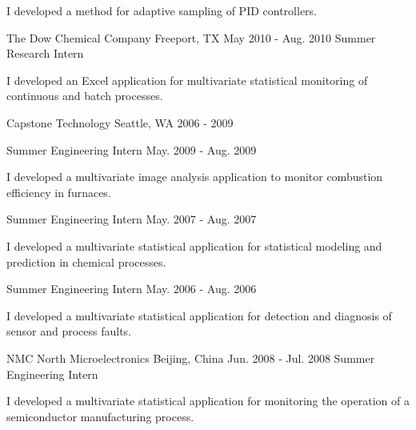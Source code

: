 \begin{cventries}
{{
\begin{cvitems} %
\item {I developed a method for adaptive sampling of PID controllers.}
\end{cvitems}
}
}
\vspace{1mm}
\cventry
{The Dow Chemical Company} %
{Freeport, TX} %
{May 2010 - Aug. 2010} %
{Summer Research Intern} %
{
\begin{cvitems} %
\item {I developed an Excel application for multivariate statistical monitoring of continuous and batch processes.}
\end{cvitems}
}
\cvmultientry
{Capstone Technology} %
{Seattle, WA}
{2006 - 2009} %
{
\cvsubentry
{Summer Engineering Intern} %
{} %
{May. 2009 - Aug. 2009} %
{
\begin{cvitems} %
\item {I developed a multivariate image analysis application to monitor combustion efficiency in furnaces.}
\end{cvitems}
}
\cvsubentry
{Summer Engineering Intern} %
{} %
{May. 2007 - Aug. 2007} %
{
\begin{cvitems} %
\item {I developed a multivariate statistical application for statistical modeling and prediction in chemical processes.}
\end{cvitems}
}
\cvsubentry
{Summer Engineering Intern} %
{} %
{May. 2006 - Aug. 2006} %
{
\begin{cvitems} %
\item {I developed a multivariate statistical application for detection and diagnosis of sensor and process faults.}
\end{cvitems}
}
}

\cventry
{NMC North Microelectronics} %
{Beijing, China} %
{Jun. 2008 - Jul. 2008} %
{Summer Engineering Intern} %
{
\begin{cvitems} %
\item {I developed a multivariate statistical application for monitoring the operation of a semiconductor manufacturing process.}
\end{cvitems}
}
\end{cventries}
